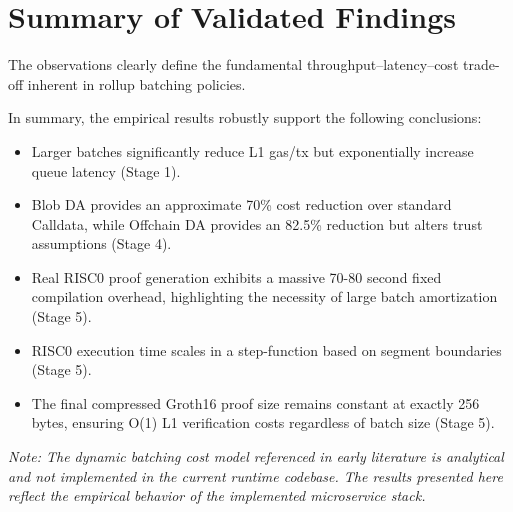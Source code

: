 \section{Summary of Validated Findings}
\label{sec:summary_of_findings}
The observations clearly define the fundamental throughput--latency--cost trade-off inherent in rollup batching policies. 

In summary, the empirical results robustly support the following conclusions:
\begin{itemize}
    \item Larger batches significantly reduce L1 gas/tx but exponentially increase queue latency (Stage 1).
    \item Blob DA provides an approximate 70\% cost reduction over standard Calldata, while Offchain DA provides an 82.5\% reduction but alters trust assumptions (Stage 4).
    \item Real RISC0 proof generation exhibits a massive 70-80 second fixed compilation overhead, highlighting the necessity of large batch amortization (Stage 5).
    \item RISC0 execution time scales in a step-function based on segment boundaries (Stage 5).
    \item The final compressed Groth16 proof size remains constant at exactly 256 bytes, ensuring O(1) L1 verification costs regardless of batch size (Stage 5).
\end{itemize}

\textit{Note: The dynamic batching cost model referenced in early literature is analytical and not implemented in the current runtime codebase. The results presented here reflect the empirical behavior of the implemented microservice stack.}